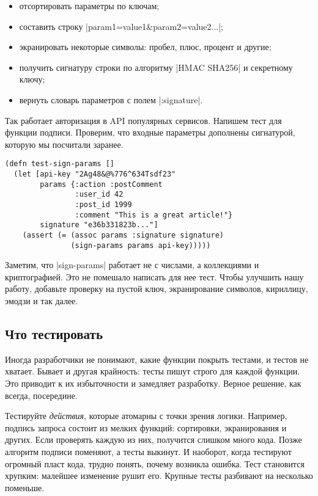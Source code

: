 \begin{itemize}

\item
  отсортировать параметры по ключам;

\item
  составить строку \spverb|param1=value1&param2=value2...|;

\item
  экранировать некоторые символы: пробел, плюс, процент и другие;

\item
  получить сигнатуру строки по алгоритму \spverb|HMAC SHA256| и секретному
  ключу;

\item
  вернуть словарь параметров с полем \spverb|:signature|.

\end{itemize}

Так работает авторизация в API популярных сервисов. Напишем тест для функции
подписи. Проверим, что входные параметры дополнены сигнатурой, которую мы
посчитали заранее.

\begin{verbatim}
(defn test-sign-params []
  (let [api-key "2Ag48&@%776^634Tsdf23"
        params {:action :postComment
                :user_id 42
                :post_id 1999
                :comment "This is a great article!"}
        signature "e36b331823b..."]
    (assert (= (assoc params :signature signature)
               (sign-params params api-key)))))
\end{verbatim}

Заметим, что \spverb|sign-params| работает не с числами, а коллекциями и
криптографией. Это не помешало написать для нее тест. Чтобы улучшить нашу
работу, добавьте проверку на пустой ключ, экранирование символов, кириллицу,
эмодзи и так далее.

\subsection{Что тестировать}

Иногда разработчики не понимают, какие функции покрыть тестами, и тестов не
хватает. Бывает и другая крайность: тесты пишут строго для каждой функции. Это
приводит к их избыточности и замедляет разработку. Верное решение, как всегда,
посередине.

Тестируйте \emph{действия}, которые атомарны с точки зрения логики. Например,
подпись запроса состоит из мелких функций: сортировки, экранирования и
других. Если проверять каждую из них, получится слишком много кода. Позже
алгоритм подписи поменяют, а тесты выкинут. И наоборот, когда тестируют огромный
пласт кода, трудно понять, почему возникла ошибка. Тест становится хрупким:
малейшее изменение рушит его. Крупные тесты разбивают на несколько поменьше.

